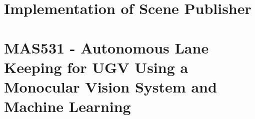 \chapter{Implementation of Scene Publisher} \label{A:lst:ScenePublisher}
\UseRawInputEncoding


\chapter{MAS531 - Autonomous Lane Keeping for UGV Using a Monocular Vision System and Machine Learning} \label{A:MAS513Report}



